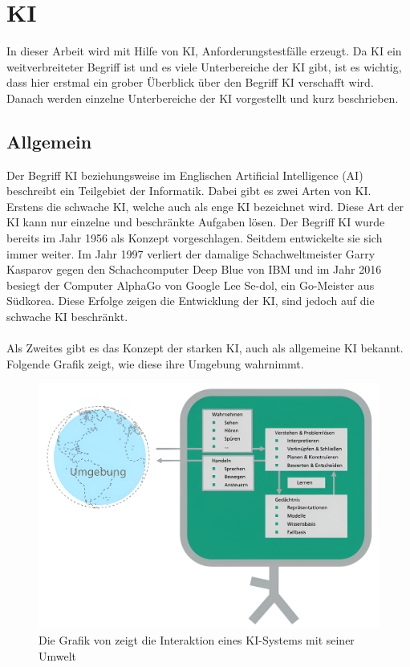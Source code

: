 \documentclass[12pt,toc=bib,toc=listof]{scrreprt}
\begin{document}
\section{KI} %
\label{sec:KI}
In dieser Arbeit wird mit Hilfe von KI, Anforderungstestfälle erzeugt. Da KI ein weitverbreiteter Begriff ist und es viele Unterbereiche der KI gibt, ist es wichtig, dass hier erstmal ein grober Überblick über den Begriff KI verschafft wird. Danach werden einzelne Unterbereiche der KI vorgestellt und kurz beschrieben.

\subsection{Allgemein} %
\label{sec:allgemein}
Der Begriff KI beziehungsweise im Englischen Artificial Intelligence (AI) beschreibt ein Teilgebiet der Informatik. Dabei gibt es zwei Arten von KI. Erstens die schwache KI, welche auch als enge KI bezeichnet wird. Diese Art der KI kann nur einzelne und beschränkte Aufgaben lösen. Der Begriff KI wurde bereits im Jahr 1956 als Konzept vorgeschlagen. Seitdem entwickelte sie sich immer weiter. Im Jahr 1997 verliert der damalige Schachweltmeister Garry Kasparov gegen den Schachcomputer Deep Blue von IBM und im Jahr 2016 besiegt der Computer AlphaGo von Google Lee Se-dol, ein Go-Meister aus Südkorea. Diese Erfolge zeigen die Entwicklung der KI, sind jedoch auf die schwache KI beschränkt.\\
\\
Als Zweites gibt es das Konzept der starken KI, auch als allgemeine KI bekannt. Folgende Grafik zeigt, wie diese ihre Umgebung wahrnimmt.
\begin{figure} [H]
    \centering
    \includegraphics[width=0.75\linewidth]{./Bilder/Fraunhofer_KI-Umgebung.png}
    \caption{Die Grafik von \textcite{Hecker2018} zeigt die Interaktion eines KI-Systems mit seiner Umwelt}
    \label{fig:enter-label}
\end{figure}
\end{document}
